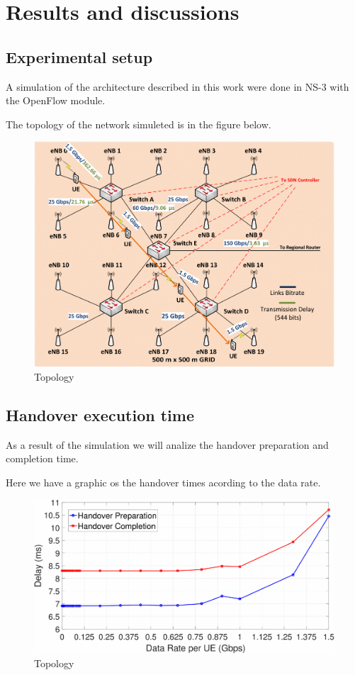\documentclass[12pt]{article}
\begin{document}
\section{Results and discussions}

\subsection{Experimental setup}

A simulation of the architecture described in this work were done in NS-3 with the OpenFlow module.

The topology of the network simuleted is in the figure below.

\begin{figure}[ht]
	\centering
	\includegraphics[width=.7\textwidth]{topology.png}
	\caption{Topology}
	\label{figure 5: Topology}
\end{figure}

\subsection{Handover execution time}

As a result of the simulation we will analize the handover preparation and completion time.

Here we have a graphic os the handover times acording to the data rate.


\begin{figure}[ht]
	\centering
	\includegraphics[width=.7\textwidth]{handover.png}
	\caption{Topology}
	\label{figure 6: Handover times}
\end{figure}
\end{document}
